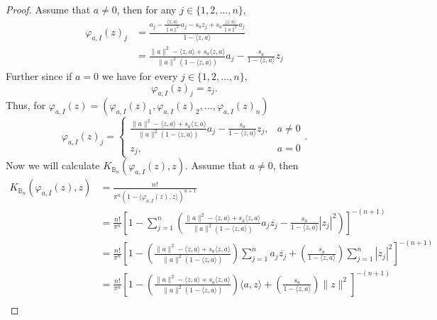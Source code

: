 \documentclass{amsart}
\theoremstyle{remark}
\newcommand{\B}{\mathbb{B}}
\begin{document}
\begin{proof}
    Assume that $a \neq 0$, then for any $j \in \{1,2,\dots,n\},$
    \begin{align*}
        \varphi_{a,I}(z)_{j} &= \frac{a_{j} - \frac{\langle z,a \rangle}{\|a\|^{2}}a_{j} - s_{a}z_{j} + s_{a}\frac{\langle z,a \rangle}{\|a\|^{2}}a_{j}}{1 - \langle z,a \rangle} \\
        &= \frac{\|a\|^{2} - \langle z,a \rangle + s_{a}\langle z,a \rangle}{\|a\|^{2}(1 - \langle z,a \rangle)}a_{j} - \frac{s_{a}}{1 - \langle z,a \rangle}z_{j}
    \end{align*}
    Further since if $a = 0$ we have for every $j \in \{1,2,\dots,n\},$
    \begin{equation*}
        \varphi_{a,I}(z)_{j} = z_{j}.
    \end{equation*}
    Thus, for $\varphi_{a,I}(z) = (\varphi_{a,I}(z)_{1}, \varphi_{a,I}(z)_{2}, \dots ,\varphi_{a,I}(z)_{n})$
    \begin{equation*}
        \varphi_{a,I}(z)_{j} =
        \begin{cases}
            \frac{\|a\|^{2} - \langle z,a \rangle + s_{a}\langle z,a \rangle}{\|a\|^{2}(1 - \langle z,a \rangle)}a_{j} - \frac{s_{a}}{1 - \langle z,a \rangle}z_{j}, & a \neq 0 \\
            z_{j}, & a = 0
        \end{cases}
        .
    \end{equation*}
    Now we will calculate $K_{\B_{n}}(\varphi_{a,I}(z),z)$. Assume that $a \neq 0$, then
    \begin{align*}
        K_{\B_{n}}(\varphi_{a,I}(z),z) 
                                  &= \frac{n!}{\pi^{n}(1-\langle \varphi_{a,I}(z),z \rangle)^{n+1}} \\
                                  &= \frac{n!}{\pi^{n}}\left[1- \sum_{j=1}^{n}\left(\frac{\|a\|^{2} - \langle z,a \rangle + s_{a}\langle z,a \rangle}{\|a\|^{2}(1 - \langle z,a \rangle)}a_{j}\overline{z_{j}} - \frac{s_{a}}{1 - \langle z,a \rangle}|z_{j}|^{2}\right)\right]^{-(n+1)} \\
                                  &= \frac{n!}{\pi^{n}}\left[1-\left(\frac{\|a\|^{2} - \langle z,a \rangle + s_{a}\langle z,a \rangle}{\|a\|^{2}(1 - \langle z,a \rangle)}\right) \sum_{j=1}^{n}a_{j}\overline{z_{j}} + \left(\frac{s_{a}}{1 - \langle z,a \rangle}\right)\sum_{j=1}^{n}|z_{j}|^{2}\right]^{-(n+1)} \\
                                  &= \frac{n!}{\pi^{n}}\left[1-\left(\frac{\|a\|^{2} - \langle z,a \rangle + s_{a}\langle z,a \rangle}{\|a\|^{2}(1 - \langle z,a \rangle)}\right) \langle a,z \rangle + \left(\frac{s_{a}}{1 - \langle z,a \rangle}\right)\|z\|^2\right]^{-(n+1)} \\

\end{align*}
\end{proof}
\end{document}

